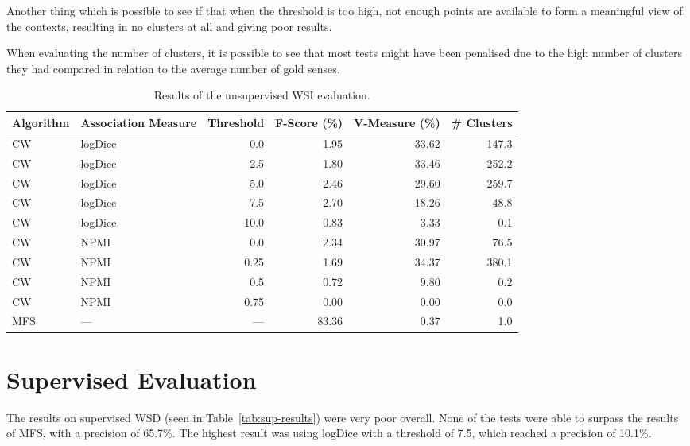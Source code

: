 Another thing which is possible to see if that when the threshold is too high,
not enough points are available to form a meaningful view of the contexts,
resulting in no clusters at all and giving poor results.

When evaluating the number of clusters, it is possible to see that most tests
might have been penalised due to the high number of clusters they had compared
in relation to the average number of gold senses.

\begin{table}[ht]
\caption{Results of the unsupervised \ac*{WSI} evaluation.}
\label{tab:unsup-results}
\begin{tabu} to \textwidth {Xlrrrr}
\hline
\textbf{Algorithm} & \textbf{Association Measure} & \textbf{Threshold} & \textbf{F-Score (\%)} & \textbf{V-Measure (\%)} & \textbf{\# Clusters} \\
\hline
\ac{CW} & logDice   &  0.0 &  1.95 & 33.62 & 147.3 \\
\ac{CW} & logDice   &  2.5 &  1.80 & 33.46 & 252.2 \\
\ac{CW} & logDice   &  5.0 &  2.46 & 29.60 & 259.7 \\
\ac{CW} & logDice   &  7.5 &  2.70 & 18.26 &  48.8 \\
\ac{CW} & logDice   & 10.0 &  0.83 &  3.33 &   0.1 \\
\hline
\ac{CW} & \ac{NPMI} & 0.0  &  2.34 & 30.97 &  76.5 \\
\ac{CW} & \ac{NPMI} & 0.25 &  1.69 & 34.37 & 380.1 \\
\ac{CW} & \ac{NPMI} & 0.5  &  0.72 &  9.80 &   0.2 \\
\ac{CW} & \ac{NPMI} & 0.75 &  0.00 &  0.00 &   0.0 \\
\hline
\ac{MFS} &      --- &  --- & 83.36 &  0.37 &   1.0 \\
\hline
\end{tabu}
\end{table}

\section{Supervised Evaluation}

The results on supervised \ac{WSD} (seen in Table~\ref{tab:sup-results}) were
very poor overall. None of the tests were able to surpass the results of
\ac{MFS}, with a precision of 65.7\%. The highest result was using logDice with
a threshold of 7.5, which reached a precision of 10.1\%.

